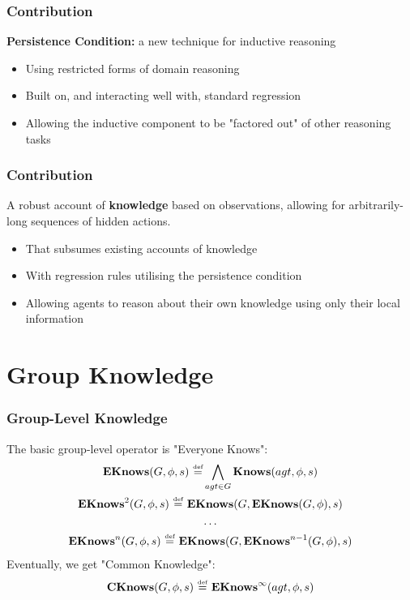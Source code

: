 \documentclass{beamer}
\newcommand{\isdef}{\hbox{$\stackrel{\mbox{\tiny def}}{=}$}}
\begin{document}
\begin{frame}
\frametitle{Contribution}
\textbf{Persistence Condition:}  a new technique for inductive reasoning
\begin{itemize}
\item Using restricted forms of domain reasoning
\item Built on, and interacting well with, standard regression
\item Allowing the inductive component to be "factored out" of other reasoning tasks
\end{itemize}
\end{frame}

\begin{frame}
\frametitle{Contribution}
A robust account of \textbf{knowledge} based on observations, allowing for
arbitrarily-long sequences of hidden actions.
\begin{itemize}
\item That subsumes existing accounts of knowledge
\item With regression rules utilising the persistence condition
\item Allowing agents to reason about their own knowledge using only their local information
\end{itemize}
\end{frame}

\section{Group Knowledge}

\begin{frame}
\frametitle{Group-Level Knowledge}
The basic group-level operator is "Everyone Knows":
\begin{gather*}
\mathbf{EKnows}(G,\phi,s)\ \isdef \bigwedge_{agt \in G} \mathbf{Knows}(agt,\phi,s)\\
\mathbf{EKnows}^{2}(G,\phi,s)\ \isdef\ \mathbf{EKnows}(G,\mathbf{EKnows}(G,\phi),s)\\
\dots \\
\mathbf{EKnows}^{n}(G,\phi,s)\ \isdef\ \mathbf{EKnows}(G,\mathbf{EKnows}^{n-1}(G,\phi),s)
\end{gather*}
Eventually, we get "Common Knowledge":
\begin{gather*}
\mathbf{CKnows}(G,\phi,s)\ \isdef\ \mathbf{EKnows}^{\infty}(agt,\phi,s)
\end{gather*}
\end{frame}
\end{document}
